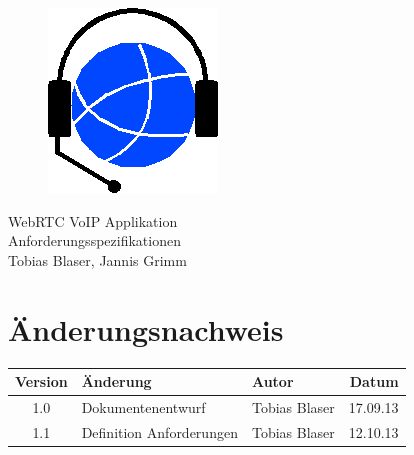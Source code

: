 

\providecommand{\documentType}{Anforderungsspezifikation}
\providecommand{\versionnumber}{1.0}



\thispagestyle{empty}
\begin{titlepage}
	\begin{center}

	\vspace*{40mm}
	
	\begin{figure}[htp]
		\centering
		\includegraphics[scale=0.60]{../img/icon-js-voip.png}
	\end{figure}		
	\vspace*{20mm}
	
	{\fontsize{40}{48} \selectfont WebRTC VoIP Applikation \\[10mm]}
	{\fontsize{40}{48} \selectfont Anforderungsspezifikationen \\[5mm]}	
	\vspace*{20mm}
	Tobias Blaser, Jannis Grimm

\end{center}
\end{titlepage}
\clearpage

\chapter*{Änderungsnachweis}
\begin{tabularx}{\textwidth}{|cXlr|} %
		\hline
		\textbf{Version} & \textbf{Änderung} & \textbf{Autor} & \textbf{Datum}\\
		\hline
		1.0 & Dokumentenentwurf & Tobias Blaser & 17.09.13\\
		1.1 & Definition Anforderungen & Tobias Blaser & 12.10.13\\
		\hline
\end{tabularx}

\tableofcontents







